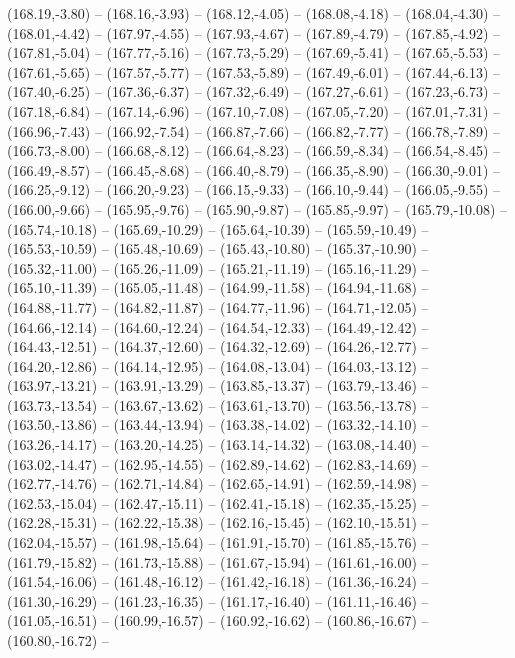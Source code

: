 {  (168.19,-3.80) -- (168.16,-3.93) -- (168.12,-4.05) -- (168.08,-4.18) -- (168.04,-4.30) -- (168.01,-4.42) -- (167.97,-4.55) --
  (167.93,-4.67) -- (167.89,-4.79) -- (167.85,-4.92) -- (167.81,-5.04) -- (167.77,-5.16) -- (167.73,-5.29) -- (167.69,-5.41) --
  (167.65,-5.53) -- (167.61,-5.65) -- (167.57,-5.77) -- (167.53,-5.89) -- (167.49,-6.01) -- (167.44,-6.13) -- (167.40,-6.25) --
  (167.36,-6.37) -- (167.32,-6.49) -- (167.27,-6.61) -- (167.23,-6.73) -- (167.18,-6.84) -- (167.14,-6.96) -- (167.10,-7.08) --
  (167.05,-7.20) -- (167.01,-7.31) -- (166.96,-7.43) -- (166.92,-7.54) -- (166.87,-7.66) -- (166.82,-7.77) -- (166.78,-7.89) --
  (166.73,-8.00) -- (166.68,-8.12) -- (166.64,-8.23) -- (166.59,-8.34) -- (166.54,-8.45) -- (166.49,-8.57) -- (166.45,-8.68) --
  (166.40,-8.79) -- (166.35,-8.90) -- (166.30,-9.01) -- (166.25,-9.12) -- (166.20,-9.23) -- (166.15,-9.33) -- (166.10,-9.44) --
  (166.05,-9.55) -- (166.00,-9.66) -- (165.95,-9.76) -- (165.90,-9.87) -- (165.85,-9.97) -- (165.79,-10.08) -- (165.74,-10.18) --
  (165.69,-10.29) -- (165.64,-10.39) -- (165.59,-10.49) -- (165.53,-10.59) -- (165.48,-10.69) -- (165.43,-10.80) -- (165.37,-10.90) --
  (165.32,-11.00) -- (165.26,-11.09) -- (165.21,-11.19) -- (165.16,-11.29) -- (165.10,-11.39) -- (165.05,-11.48) -- (164.99,-11.58) --
  (164.94,-11.68) -- (164.88,-11.77) -- (164.82,-11.87) -- (164.77,-11.96) -- (164.71,-12.05) -- (164.66,-12.14) -- (164.60,-12.24) --
  (164.54,-12.33) -- (164.49,-12.42) -- (164.43,-12.51) -- (164.37,-12.60) -- (164.32,-12.69) -- (164.26,-12.77) -- (164.20,-12.86) --
  (164.14,-12.95) -- (164.08,-13.04) -- (164.03,-13.12) -- (163.97,-13.21) -- (163.91,-13.29) -- (163.85,-13.37) -- (163.79,-13.46) --
  (163.73,-13.54) -- (163.67,-13.62) -- (163.61,-13.70) -- (163.56,-13.78) -- (163.50,-13.86) -- (163.44,-13.94) -- (163.38,-14.02) --
  (163.32,-14.10) -- (163.26,-14.17) -- (163.20,-14.25) -- (163.14,-14.32) -- (163.08,-14.40) -- (163.02,-14.47) -- (162.95,-14.55) --
  (162.89,-14.62) -- (162.83,-14.69) -- (162.77,-14.76) -- (162.71,-14.84) -- (162.65,-14.91) -- (162.59,-14.98) -- (162.53,-15.04) --
  (162.47,-15.11) -- (162.41,-15.18) -- (162.35,-15.25) -- (162.28,-15.31) -- (162.22,-15.38) -- (162.16,-15.45) -- (162.10,-15.51) --
  (162.04,-15.57) -- (161.98,-15.64) -- (161.91,-15.70) -- (161.85,-15.76) -- (161.79,-15.82) -- (161.73,-15.88) -- (161.67,-15.94) --
  (161.61,-16.00) -- (161.54,-16.06) -- (161.48,-16.12) -- (161.42,-16.18) -- (161.36,-16.24) -- (161.30,-16.29) -- (161.23,-16.35) --
  (161.17,-16.40) -- (161.11,-16.46) -- (161.05,-16.51) -- (160.99,-16.57) -- (160.92,-16.62) -- (160.86,-16.67) -- (160.80,-16.72) --
}

